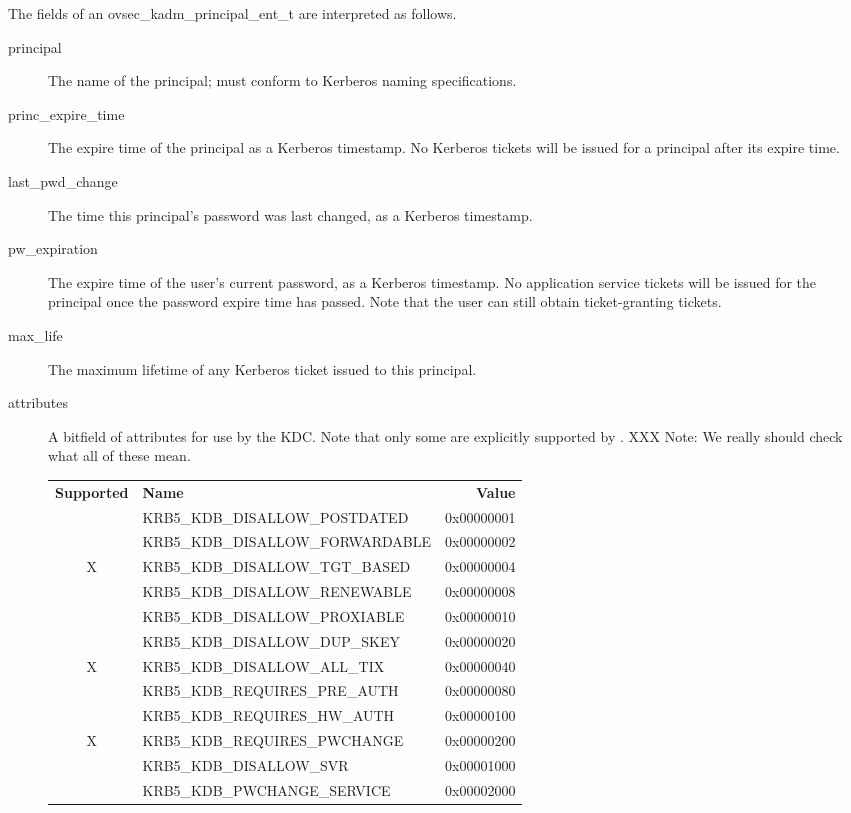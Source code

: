The fields of an ovsec_kadm_principal_ent_t are interpreted as
follows.

\begin{description}
\item[principal] The name of the principal; must conform to Kerberos
naming specifications.

\item[princ_expire_time] The expire time of the principal as a Kerberos
timestamp.  No Kerberos tickets will be issued for a principal after
its expire time.

\item[last_pwd_change] The time this principal's password was last
changed, as a Kerberos timestamp.

\item[pw_expiration] The expire time of the user's current password, as a
Kerberos timestamp.  No application service tickets will be issued for the
principal once the password expire time has passed.  Note that the
user can still obtain ticket-granting tickets.

\item[max_life] The maximum lifetime of any Kerberos ticket issued to
this principal.

\item[attributes] A bitfield of attributes for use by the KDC.  
Note that only some are explicitly supported by \secure{}.  XXX Note:
We really should check what all of these mean.

\begin{tabular}{clr}
{\bf Supported} & {\bf Name} & {\bf Value} \\
  & KRB5_KDB_DISALLOW_POSTDATED     & 0x00000001 \\
  & KRB5_KDB_DISALLOW_FORWARDABLE   & 0x00000002 \\
X & KRB5_KDB_DISALLOW_TGT_BASED     & 0x00000004 \\
  & KRB5_KDB_DISALLOW_RENEWABLE     & 0x00000008 \\
  & KRB5_KDB_DISALLOW_PROXIABLE     & 0x00000010 \\
  & KRB5_KDB_DISALLOW_DUP_SKEY      & 0x00000020 \\
X & KRB5_KDB_DISALLOW_ALL_TIX       & 0x00000040 \\
  & KRB5_KDB_REQUIRES_PRE_AUTH      & 0x00000080 \\
  & KRB5_KDB_REQUIRES_HW_AUTH       & 0x00000100 \\
X & KRB5_KDB_REQUIRES_PWCHANGE      & 0x00000200 \\
  & KRB5_KDB_DISALLOW_SVR           & 0x00001000 \\
  & KRB5_KDB_PWCHANGE_SERVICE       & 0x00002000
\end{tabular}


\end{description}
